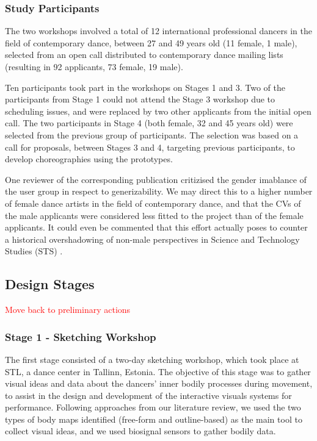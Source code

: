 
\subsubsection{Study Participants}

The two workshops involved a total of 12 international professional dancers in the field of contemporary dance, between 27 and 49 years old (11 female, 1 male), selected from an open call distributed to contemporary dance mailing lists (resulting in 92 applicants, 73 female, 19 male). 

Ten participants took part in the workshops on Stages 1 and 3. Two of the participants from Stage 1 could not attend the Stage 3 workshop due to scheduling issues, and were replaced by two other applicants from the initial open call. The two participants in Stage 4 (both female, 32 and 45 years old) were selected from the previous group of participants. The selection was based on a call for proposals, between Stages 3 and 4, targeting previous participants, to develop choreographies using the prototypes.

One reviewer of the corresponding publication critizised the gender imablance of the user group in respect to generizability. We may direct this to a higher number of female dance artists in the field of contemporary dance, and that the CVs of the male applicants were considered less fitted to the project than of the female applicants. It could even be commented that this effort actually poses to counter a historical overshadowing of non-male perspectives in Science and Technology Studies (STS) \cite{wajcman_feminist_2010,hook_soma_2019}.

\subsection{Design Stages}

\textcolor{red}{Move back to preliminary actions}
\subsubsection{Stage 1 - Sketching Workshop}

The first stage consisted of a two-day sketching workshop, which
took place at STL, a dance center in Tallinn, Estonia. The objective of this stage was to gather visual ideas and data about the dancers’ inner bodily processes during movement, to assist in the design and development of the interactive visuals systems for performance. Following approaches from our literature review, we used the two types of body maps identified (free-form and outline-based) as the main tool to collect visual ideas, and we used biosignal sensors to gather bodily data.

